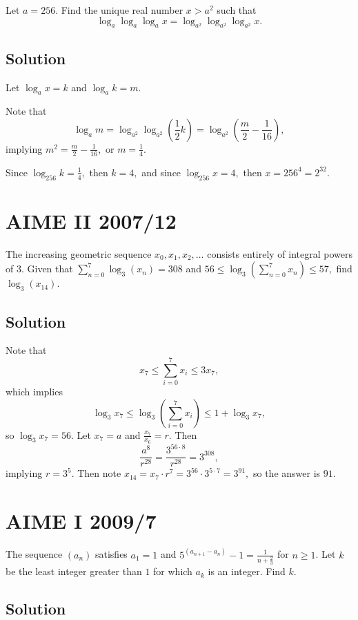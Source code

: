 \documentclass{article}
\begin{document}
Let $a=256$. Find the unique real number $x>a^2$ such that
\[\log_a \log_a \log_a x = \log_{a^2} \log_{a^2} \log_{a^2} x.\]

\subsection{Solution}

Let $\log_a{x}=k$ and $\log_{a}k=m.$

Note that \[\log_a{m}=\log_{a^2}\log_{a^2}(\frac{1}{2}k)=\log_{a^2}(\frac{m}{2}-\frac{1}{16}),\] implying $m^2=\frac{m}{2}-\frac{1}{16},$ or $m=\frac{1}{4}.$

Since $\log_{256}k=\frac{1}{4},$ then $k=4,$ and since $\log_{256}x=4,$ then $x=256^4=2^{32}.$

\pagebreak\section{AIME II 2007/12}

The increasing geometric sequence $x_{0},x_{1},x_{2},\ldots$ consists entirely of integral powers of $3.$ Given that $\sum_{n=0}^{7}\log_{3}(x_{n}) = 308$ and $56 \leq \log_{3}\left ( \sum_{n=0}^{7}x_{n}\right ) \leq 57,$ find $\log_{3}(x_{14}).$

\subsection{Solution}

Note that
    \[x_7\leq\sum\limits_{i=0}^{7}x_i \leq 3x_7,\]
    which implies
    \[\log_{3}x_7\leq\log_3(\sum\limits_{i=0}^{7}x_i)\leq 1+\log_{3}x_7,\]
    so $\log_{3}x_7=56.$
    Let $x_7=a$ and $\frac{x_7}{x_6}=r.$ Then
    \[\frac{a^8}{r^28}=\frac{3^{56\cdot 8}}{r^28}=3^{308},\]
    implying $r=3^5.$ Then note $x_14=x_7\cdot r^7=3^{56}\cdot 3^{5\cdot 7}=3^{91},$ so the answer is $91.$

\pagebreak\section{AIME I 2009/7}

The sequence $(a_n)$ satisfies $a_1 = 1$ and $5^{(a_{n + 1} - a_n)} - 1 = \frac {1}{n + \frac {2}{3}}$ for $n \geq 1$. Let $k$ be the least integer greater than $1$ for which $a_k$ is an integer. Find $k$.

\subsection{Solution}
\end{document}
